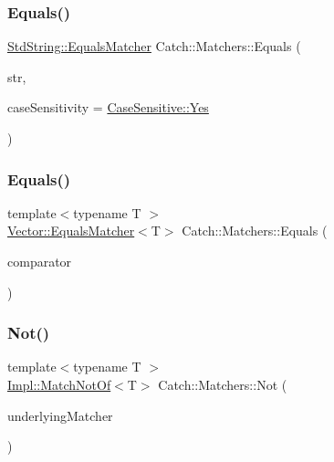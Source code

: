 \subsubsection{\texorpdfstring{Equals()}{Equals()}\hspace{0.1cm}{\footnotesize\ttfamily [1/2]}}
{\footnotesize\ttfamily \mbox{\hyperlink{struct_catch_1_1_matchers_1_1_std_string_1_1_equals_matcher}{Std\+String\+::\+Equals\+Matcher}} Catch\+::\+Matchers\+::\+Equals (\begin{DoxyParamCaption}\item[{std\+::string const \&}]{str,  }\item[{\mbox{\hyperlink{struct_catch_1_1_case_sensitive_aad49d3aee2d97066642fffa919685c6a}{Case\+Sensitive\+::\+Choice}}}]{case\+Sensitivity = {\ttfamily \mbox{\hyperlink{struct_catch_1_1_case_sensitive_aad49d3aee2d97066642fffa919685c6aa7c5550b69ec3c502e6f609b67f9613c6}{Case\+Sensitive\+::\+Yes}}} }\end{DoxyParamCaption})}

\mbox{\label{namespace_catch_1_1_matchers_a332a401fb0da33c988e9cfa400ecce1b}} 
\subsubsection{\texorpdfstring{Equals()}{Equals()}\hspace{0.1cm}{\footnotesize\ttfamily [2/2]}}
{\footnotesize\ttfamily template$<$typename T $>$ \\
\mbox{\hyperlink{struct_catch_1_1_matchers_1_1_vector_1_1_equals_matcher}{Vector\+::\+Equals\+Matcher}}$<$T$>$ Catch\+::\+Matchers\+::\+Equals (\begin{DoxyParamCaption}\item[{std\+::vector$<$ T $>$ const \&}]{comparator }\end{DoxyParamCaption})}

\mbox{\label{namespace_catch_1_1_matchers_acd3369efa3f62ffa1269df4b8ddf8134}} 
\subsubsection{\texorpdfstring{Not()}{Not()}}
{\footnotesize\ttfamily template$<$typename T $>$ \\
\mbox{\hyperlink{struct_catch_1_1_matchers_1_1_impl_1_1_match_not_of}{Impl\+::\+Match\+Not\+Of}}$<$T$>$ Catch\+::\+Matchers\+::\+Not (\begin{DoxyParamCaption}\item[{\mbox{\hyperlink{struct_catch_1_1_matchers_1_1_impl_1_1_matcher_base}{Impl\+::\+Matcher\+Base}}$<$ T $>$ const \&}]{underlying\+Matcher }\end{DoxyParamCaption})\hspace{0.3cm}{\ttfamily [inline]}}

